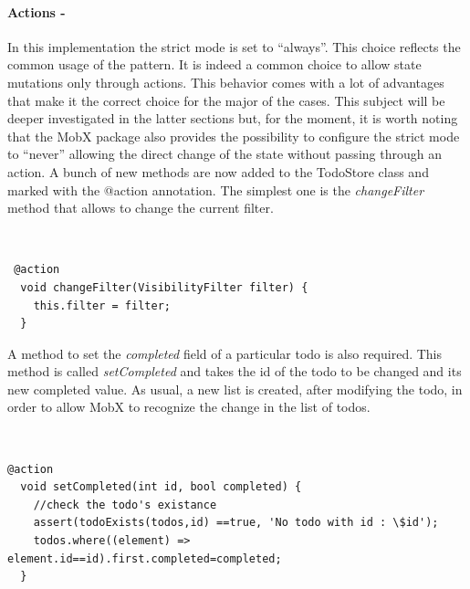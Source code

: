 \paragraph{Actions - }
\label{subpar:todo_app_bloc_core_state}In this implementation the strict mode is set to “always”. This choice reflects the common usage of the pattern. It is indeed a common choice to allow state mutations only through actions. This behavior comes with a lot of advantages that make it the correct choice for the major of the cases. This subject will be deeper investigated in the latter sections but, for the moment,  it is worth noting that the MobX package also provides the possibility to configure the strict mode to “never”  allowing the direct change of the state without passing through an action.  A bunch of new methods are now added to the TodoStore class and marked with the @action annotation. The simplest one is the \textit{changeFilter} method that allows to change the current filter.
\begin{code}
\mbox{}\\
 \mbox{}
		\label{code:2.14}
\begin{verbatim} 
 @action
  void changeFilter(VisibilityFilter filter) {
    this.filter = filter;
  }
\end{verbatim}
\mbox{}
\end{code}

A method to set the \textit{completed} field of a particular todo is also required. This method is called \textit{setCompleted} and takes the id of the todo to be changed and its new completed value. As usual,  a new list is created, after modifying the todo, in order to allow MobX to recognize the change in the list of todos.
\begin{code}
\mbox{}\\
 \mbox{}
		\label{code:2.14}
\begin{verbatim}
@action
  void setCompleted(int id, bool completed) {
    //check the todo's existance
    assert(todoExists(todos,id) ==true, 'No todo with id : \$id');
    todos.where((element) => element.id==id).first.completed=completed;
  }

\end{verbatim}
\mbox{}
\end{code}

